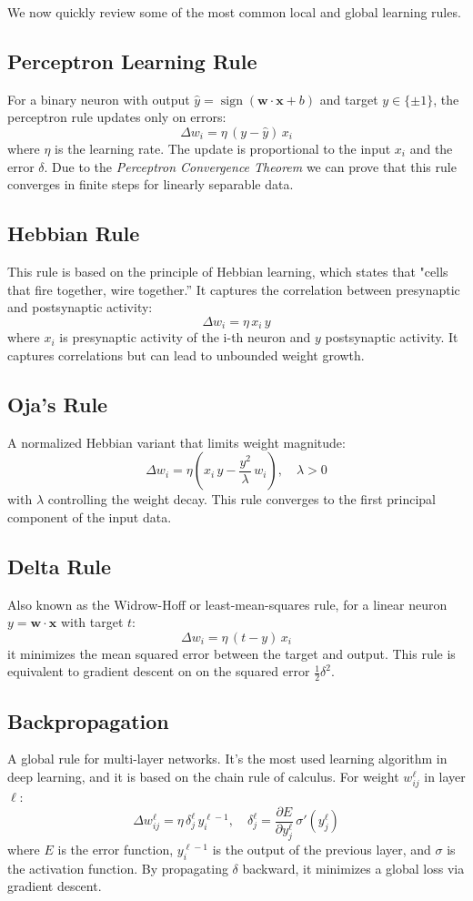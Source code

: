 \documentclass[a4paper,12pt]{report}
\begin{document}
We now quickly review some of the most common local and global learning rules.
\subsection*{Perceptron Learning Rule}
For a binary neuron with output $\hat y=\operatorname{sign}(\mathbf{w}\cdot\mathbf{x}+b)$ and target $y\in\{\pm1\}$, the 
perceptron rule updates only on errors:
\[
  \Delta w_i = \eta\,\left(y - \hat y\right)\,x_i
\]
where $\eta$ is the learning rate. The update is proportional to the input $x_i$ and the error $\delta$.
Due to the \emph{Perceptron Convergence Theorem} we can prove that this rule converges 
in finite steps for linearly separable data.

\subsection*{Hebbian Rule}
This rule is based on the principle of Hebbian learning, which states that "cells that fire together, 
wire together.”
It captures the correlation between presynaptic and postsynaptic activity:
\[
  \Delta w_i = \eta\,x_i\,y
\]
where $x_i$ is presynaptic activity of the i-th neuron and $y$ postsynaptic activity. It captures 
correlations but can lead to unbounded weight growth.

\subsection*{Oja's Rule}
A normalized Hebbian variant that limits weight magnitude:
\[
  \Delta w_i = \eta \left(x_i\,y - \frac{y^2}{\lambda}\,w_i\right),\quad \lambda>0
\]
with $\lambda$ controlling the weight decay. This rule converges to the first principal component of the
input data.

\subsection*{Delta Rule}
Also known as the Widrow-Hoff or least-mean-squares rule, for a linear neuron $y=\mathbf{w}\cdot\mathbf{x}$ 
with target $t$:
\[
  \Delta w_i = \eta\,\left(t - y\right)\,x_i
\]
it minimizes the mean squared error between the target and output. This rule is equivalent to gradient 
descent on on the squared error $\frac12\delta^2$.

\subsection*{Backpropagation}
A global rule for multi-layer networks. It's the most used learning algorithm in deep learning,
and it is based on the chain rule of calculus. For weight $w_{ij}^\ell$ in layer $\ell$:
\[
  \Delta w_{ij}^\ell = \eta\,\delta_j^\ell\,y_i^{\ell-1},\quad \delta_j^\ell = \frac{\partial E}{\partial y_j^\ell}\,\sigma'(y_j^\ell)
\]
where $E$ is the error function, $y_i^{\ell-1}$ is the output of the previous layer, and $\sigma$ is the
activation function.
By propagating $\delta$ backward, it minimizes a global loss via gradient descent.
\end{document}
